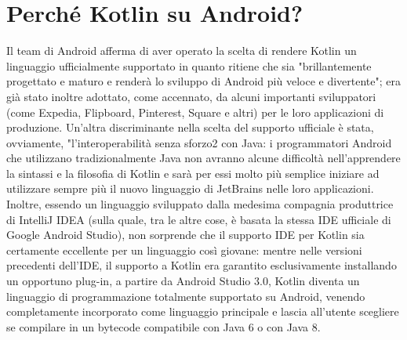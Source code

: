 \section{Perché Kotlin su Android?}
Il team di Android afferma di aver operato la scelta di rendere Kotlin un linguaggio ufficialmente supportato in quanto ritiene che sia "brillantemente progettato e maturo e renderà lo sviluppo di Android più veloce e divertente"; era già stato inoltre adottato, come accennato, da alcuni importanti sviluppatori (come Expedia, Flipboard, Pinterest, Square e altri) per le loro applicazioni di produzione. Un’altra discriminante nella scelta del supporto ufficiale è stata, ovviamente, "l'interoperabilità senza sforzo2 con Java: i programmatori Android che utilizzano tradizionalmente Java non avranno alcune difficoltà nell’apprendere la sintassi e la filosofia di Kotlin e sarà per essi molto più semplice iniziare ad utilizzare sempre più il nuovo linguaggio di JetBrains nelle loro applicazioni. Inoltre, essendo un linguaggio sviluppato dalla medesima compagnia produttrice di IntelliJ IDEA (sulla quale, tra le altre cose, è basata la stessa IDE ufficiale di Google Android Studio), non sorprende che il supporto IDE per Kotlin sia certamente eccellente per un linguaggio così giovane: mentre nelle versioni precedenti dell’IDE, il supporto a Kotlin era garantito esclusivamente installando un opportuno plug-in, a partire da Android Studio 3.0, Kotlin diventa un linguaggio di programmazione totalmente supportato su Android, venendo completamente incorporato come linguaggio principale e lascia all’utente scegliere se compilare in un bytecode compatibile con Java 6 o con Java 8.\\


